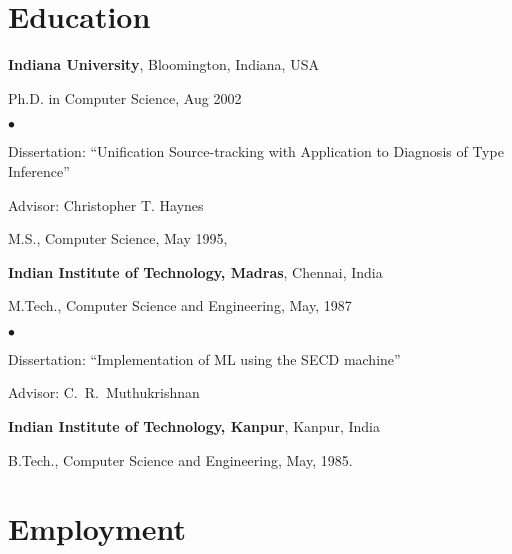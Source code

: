 \documentclass[11pt,margin,line]{res}
\newenvironment{list1}{
  \begin{list}{\ding{113}}{%
      \setlength{\itemsep}{0in}
      \setlength{\parsep}{0in} \setlength{\parskip}{0in}
      \setlength{\topsep}{0in} \setlength{\partopsep}{0in} 
      \setlength{\leftmargin}{0.17in}}}{\end{list}}
\newenvironment{list2}{
  \begin{list}{$\bullet$}{%
      \setlength{\itemsep}{0in}
      \setlength{\parsep}{0in} \setlength{\parskip}{0in}
      \setlength{\topsep}{0in} \setlength{\partopsep}{0in} 
      \setlength{\leftmargin}{0.2in}}}{\end{list}}
\begin{document}
\begin{resume}
\section{\sc Education}
{\bf Indiana University}, Bloomington, Indiana, USA\\
\vspace*{-.1in}
\begin{list1}
\item[] Ph.D. in Computer Science, Aug 2002
\begin{list2}
\vspace*{.05in}
\item Dissertation:  ``Unification Source-tracking with
  Application to Diagnosis of Type Inference'' 
\item Advisor:  Christopher T. Haynes
\end{list2}
\vspace*{.05in}
\item[] M.S., Computer Science,  May 1995,
\end{list1}

{\bf Indian Institute of Technology, Madras}, Chennai, India\\
\vspace*{-.1in}
\begin{list1}
\item[] M.Tech., Computer Science and Engineering,  May, 1987
\begin{list2}
\vspace*{.05in}
\item Dissertation:  ``Implementation of ML using the SECD
  machine'' 
\item Advisor: C.~R.~Muthukrishnan
\end{list2}
\end{list1}

{\bf Indian Institute of Technology, Kanpur}, Kanpur, India\\
\vspace*{-.1in}
\begin{list1}
\item[] B.Tech., Computer Science and Engineering,  May, 1985. %
\end{list1}

\section{\sc Employment}


\end{resume}
\end{document}

